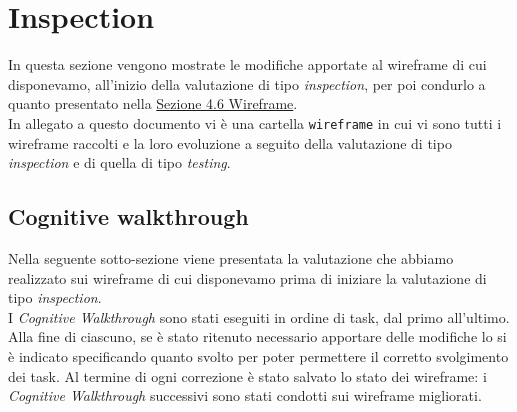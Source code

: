 \section{Inspection}
\label{s:inspection}

In questa sezione vengono mostrate le modifiche apportate al wireframe di cui disponevamo, all'inizio della valutazione di tipo \textit{inspection}, per poi condurlo a quanto presentato nella \hyperref[s:wireframe]{Sezione 4.6 Wireframe}.\\
In allegato a questo documento vi è una cartella \texttt{wireframe} in cui vi sono tutti i wireframe raccolti e la loro evoluzione a seguito della valutazione di tipo \textit{inspection} e di quella di tipo \textit{testing}.

\subsection{Cognitive walkthrough}
\label{ss:cognitive-walkthrough}

Nella seguente sotto-sezione viene presentata la valutazione che abbiamo realizzato sui wireframe di cui disponevamo prima di iniziare la valutazione di tipo \textit{inspection}.\\
I \textit{Cognitive Walkthrough} sono stati eseguiti in ordine di task, dal primo all'ultimo. Alla fine di ciascuno, se è stato ritenuto necessario apportare delle modifiche lo si è indicato specificando quanto svolto per poter permettere il corretto svolgimento dei task.
Al termine di ogni correzione è stato salvato lo stato dei wireframe: i \textit{Cognitive Walkthrough} successivi sono stati condotti sui wireframe migliorati.\\








